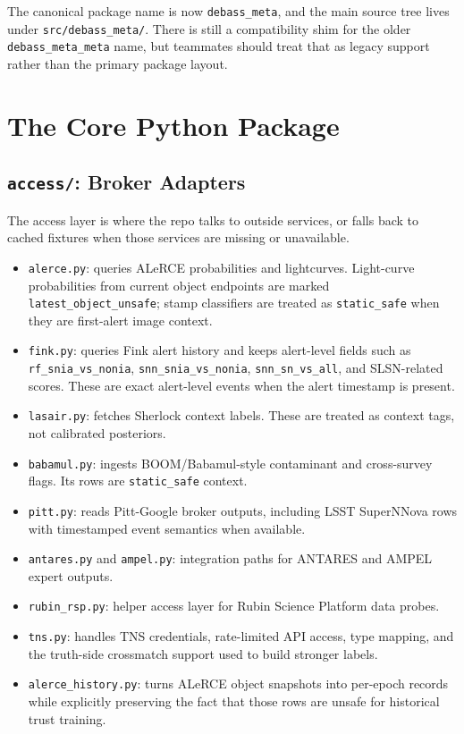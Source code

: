 \documentclass[11pt]{article}
\newcommand{\code}[1]{\texttt{#1}}
\begin{document}
The canonical package name is now \code{debass\_meta}, and the main source tree lives under \code{src/debass\_meta/}. There is still a compatibility shim for the older \code{debass\_meta\_meta} name, but teammates should treat that as legacy support rather than the primary package layout.

\section{The Core Python Package}

\subsection{\code{access/}: Broker Adapters}

The access layer is where the repo talks to outside services, or falls back to cached fixtures when those services are missing or unavailable.

\begin{itemize}
\item \code{alerce.py}: queries ALeRCE probabilities and lightcurves. Light-curve probabilities from current object endpoints are marked \code{latest\_object\_unsafe}; stamp classifiers are treated as \code{static\_safe} when they are first-alert image context.
\item \code{fink.py}: queries Fink alert history and keeps alert-level fields such as \code{rf\_snia\_vs\_nonia}, \code{snn\_snia\_vs\_nonia}, \code{snn\_sn\_vs\_all}, and SLSN-related scores. These are exact alert-level events when the alert timestamp is present.
\item \code{lasair.py}: fetches Sherlock context labels. These are treated as context tags, not calibrated posteriors.
\item \code{babamul.py}: ingests BOOM/Babamul-style contaminant and cross-survey flags. Its rows are \code{static\_safe} context.
\item \code{pitt.py}: reads Pitt-Google broker outputs, including LSST SuperNNova rows with timestamped event semantics when available.
\item \code{antares.py} and \code{ampel.py}: integration paths for ANTARES and AMPEL expert outputs.
\item \code{rubin\_rsp.py}: helper access layer for Rubin Science Platform data probes.
\item \code{tns.py}: handles TNS credentials, rate-limited API access, type mapping, and the truth-side crossmatch support used to build stronger labels.
\item \code{alerce\_history.py}: turns ALeRCE object snapshots into per-epoch records while explicitly preserving the fact that those rows are unsafe for historical trust training.
\end{itemize}
\end{document}
